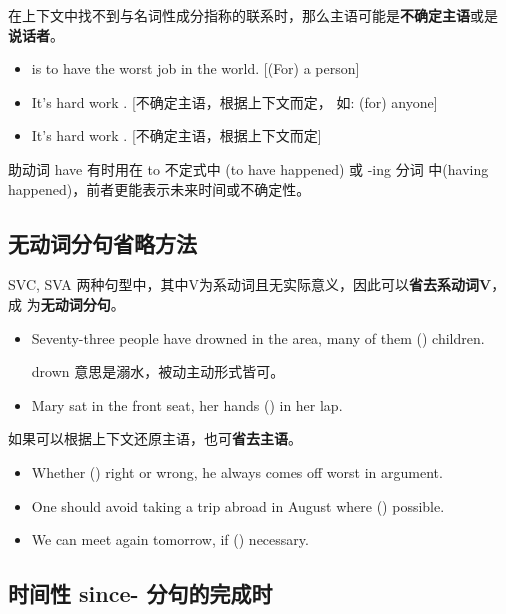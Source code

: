 在上下文中找不到与名词性成分指称的联系时，那么主语可能是\textbf{不确定主语}或是
\textbf{说话者}。
\begin{itemize}
\item {} is to have the worst job in the
  world. [(For) a person]
\item It's hard work . [不确定主语，根据上下文而定，
  如: (for) anyone]
\item It's hard work . [不确定主语，根据上下文而定]
\end{itemize}

助动词 have 有时用在 to 不定式中 (to have happened) 或 -ing 分词
中(having happened)，前者更能表示未来时间或不确定性。

\subsection{无动词分句省略方法}

SVC, SVA 两种句型中，其中V为系动词且无实际意义，因此可以\textbf{省去系动词V}，成
为\textbf{无动词分句}。

\begin{itemize}
\item Seventy-three people have drowned in the area, many of them
  () children.

  drown 意思是溺水，被动主动形式皆可。

\item  Mary sat in the front seat, her hands () in her lap.
\end{itemize}

如果可以根据上下文还原主语，也可\textbf{省去主语}。
\begin{itemize}
\item Whether () right or wrong, he always comes off worst in
  argument.

\item One should avoid taking a trip abroad in August where () possible.

\item We can meet again tomorrow, if () necessary.

\end{itemize}

\subsection{时间性 since- 分句的完成时}

